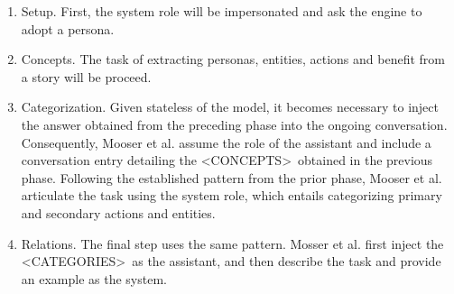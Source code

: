 \begin{enumerate}
\item Setup. First, the system role will be impersonated and ask the engine to adopt a persona. 
\item Concepts. The task of extracting personas, entities, actions and benefit from a story will be proceed.
\item Categorization. Given stateless of the model, it becomes necessary to inject the answer obtained from the preceding phase into the ongoing conversation. Consequently, Mooser et al. assume the role of the assistant and include a conversation entry detailing the  \textless CONCEPTS\textgreater \ obtained in the previous phase. Following the established pattern from the prior phase, Mooser et al. articulate the task using the system role, which entails categorizing primary and secondary actions and entities.
\item Relations. The final step uses the same pattern. Mosser et al. first inject the \textless CATEGORIES\textgreater \ as the assistant, and then describe the task and provide an example as the system.
\end{enumerate}




